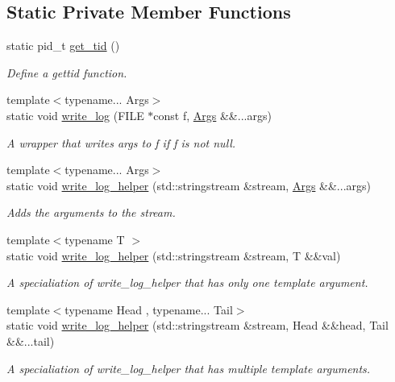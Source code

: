 \subsection*{Static Private Member Functions}
\begin{DoxyCompactItemize}
\item 
static pid\+\_\+t \hyperlink{class_utilities_a93f3699cf92128c66efa084ff1399a45}{get\+\_\+tid} ()
\begin{DoxyCompactList}\small\item\em Define a gettid function. \end{DoxyCompactList}\item 
{\footnotesize template$<$typename... Args$>$ }\\static void \hyperlink{class_utilities_a7085b246ac1d31d8d3ac16663e6718d9}{write\+\_\+log} (F\+I\+LE $\ast$const f, \hyperlink{struct_args}{Args} \&\&...args)
\begin{DoxyCompactList}\small\item\em A wrapper that writes args to f if f is not null. \end{DoxyCompactList}\item 
{\footnotesize template$<$typename... Args$>$ }\\static void \hyperlink{class_utilities_a0763f59c16f6eb83b9c0e8abe014287a}{write\+\_\+log\+\_\+helper} (std\+::stringstream \&stream, \hyperlink{struct_args}{Args} \&\&...args)
\begin{DoxyCompactList}\small\item\em Adds the arguments to the stream. \end{DoxyCompactList}\item 
{\footnotesize template$<$typename T $>$ }\\static void \hyperlink{class_utilities_ae816a2f7a656a433f6204687bff59a6c}{write\+\_\+log\+\_\+helper} (std\+::stringstream \&stream, T \&\&val)
\begin{DoxyCompactList}\small\item\em A specialiation of write\+\_\+log\+\_\+helper that has only one template argument. \end{DoxyCompactList}\item 
{\footnotesize template$<$typename Head , typename... Tail$>$ }\\static void \hyperlink{class_utilities_a6b7a8d8b77768fde23f66d4f7a57c1c6}{write\+\_\+log\+\_\+helper} (std\+::stringstream \&stream, Head \&\&head, Tail \&\&...tail)
\begin{DoxyCompactList}\small\item\em A specialiation of write\+\_\+log\+\_\+helper that has multiple template arguments. \end{DoxyCompactList}\end{DoxyCompactItemize}
